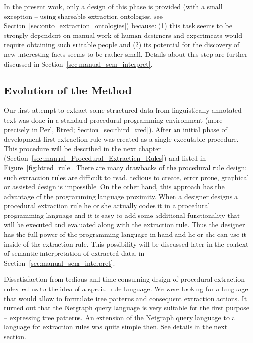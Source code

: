 \begin{enumerate}
In the present work, only a design of this phase is provided (with a small exception -- using shareable extraction ontologies, see Section~\ref{sec:onto_extraction_ontologies}) because: (1) this task seems to be strongly dependent on manual work of human designers and experiments would require obtaining such suitable people and (2) its potential for the discovery of new interesting facts seems to be rather small. Details about this step are further discussed in Section~\ref{sec:manual_sem_interpret}.
\end{enumerate}



\subsection{Evolution of the Method}

Our first attempt to extract some structured data from linguistically annotated text was done in a standard procedural programming environment (more precisely in Perl, Btred; Section~\ref{sec:third_tred}). After an initial phase of development first extraction rule was created as a single executable procedure. This procedure will be described in the next chapter (Section~\ref{sec:manual_Procedural_Extraction_Rules}) and listed in Figure~\ref{fig:btred_rule}. There are many drawbacks of the procedural rule design: such extraction rules are difficult to read, tedious to create, error prone, graphical or assisted design is impossible. On the other hand, this approach has the advantage of the programming language proximity. When a designer designs a procedural extraction rule he or she actually codes it in a procedural programming language and it is easy to add some additional functionality that will be executed and evaluated along with the extraction rule. Thus the designer has the full power of the programming language in hand and he or she can use it inside of the extraction rule. This possibility will be discussed later in the context of semantic interpretation of extracted data, in Section~\ref{sec:manual_sem_interpret}.

Dissatisfaction from tedious and time consuming design of procedural extraction rules led us to the idea of a special rule language. We were looking for a language that would allow to formulate tree patterns and consequent extraction actions. It turned out that the Netgraph query language is very suitable for the first purpose -- expressing tree patterns. An extension of the Netgraph query language to a language for extraction rules was quite simple then. See details in the next section.

